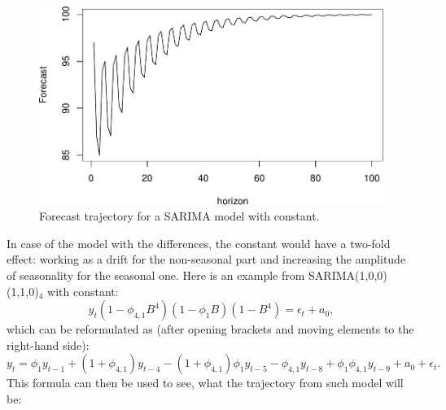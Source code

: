 \documentclass[]{book}
\theoremstyle{definition}
\theoremstyle{definition}
\theoremstyle{definition}
\theoremstyle{definition}
\theoremstyle{remark}
\begin{document}
\begin{figure}
\centering
\includegraphics{Svetunkov--2022----ADAM_files/figure-latex/SARIMAConstantTrajectory-1.pdf}
\caption{\label{fig:SARIMAConstantTrajectory}Forecast trajectory for a SARIMA model with constant.}
\end{figure}

In case of the model with the differences, the constant would have a two-fold effect: working as a drift for the non-seasonal part and increasing the amplitude of seasonality for the seasonal one. Here is an example from SARIMA(1,0,0)(1,1,0)\(_4\) with constant:
\begin{equation}
  y_t (1 -\phi_{4,1} B^4)(1 -\phi_{1} B) (1 -B^4) = \epsilon_t + a_0 ,
  \label{eq:SARIMA101110Example01}
\end{equation}
which can be reformulated as (after opening brackets and moving elements to the right-hand side):
\begin{equation}
  y_t = \phi_{1} y_{t-1} + (1+\phi_{4,1}) y_{t-4} -(1+\phi_{4,1}) \phi_{1} y_{t-5} -\phi_{4,1} y_{t-8} + \phi_1 \phi_{4,1} y_{t-9} + a_0 + \epsilon_t .
  \label{eq:SARIMA101110Example02}
\end{equation}
This formula can then be used to see, what the trajectory from such model will be:
\end{document}
